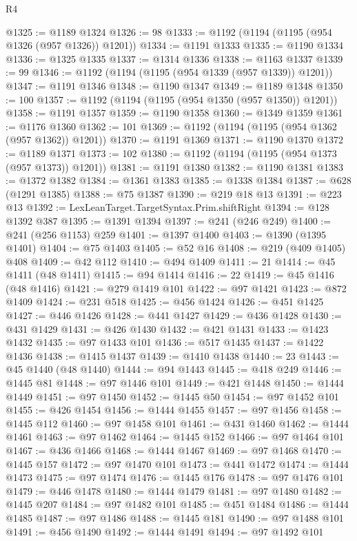 \begin{lexlean}{R4}
\begin{coremodule}
@1325 := @1189 @1324
@1326 := 98
@1333 := @1192 (@1194 (@1195 (@954 @1326 (@957 @1326)) @1201))
@1334 := @1191 @1333
@1335 := @1190 @1334
@1336 := @1325 @1335
@1337 := @1314 @1336
@1338 := @1163 @1337
@1339 := 99
@1346 := @1192 (@1194 (@1195 (@954 @1339 (@957 @1339)) @1201))
@1347 := @1191 @1346
@1348 := @1190 @1347
@1349 := @1189 @1348
@1350 := 100
@1357 := @1192 (@1194 (@1195 (@954 @1350 (@957 @1350)) @1201))
@1358 := @1191 @1357
@1359 := @1190 @1358
@1360 := @1349 @1359
@1361 := @1176 @1360
@1362 := 101
@1369 := @1192 (@1194 (@1195 (@954 @1362 (@957 @1362)) @1201))
@1370 := @1191 @1369
@1371 := @1190 @1370
@1372 := @1189 @1371
@1373 := 102
@1380 := @1192 (@1194 (@1195 (@954 @1373 (@957 @1373)) @1201))
@1381 := @1191 @1380
@1382 := @1190 @1381
@1383 := @1372 @1382
@1384 := @1361 @1383
@1385 := @1338 @1384
@1387 := @628 (@1291 @1385)
@1388 := @75 @1387
@1390 := @219 @18 @13
@1391 := @223 @13
@1392 := LexLeanTarget.TargetSyntax.Prim.shiftRight
@1394 := @128 @1392 @387
@1395 := @1391 @1394
@1397 := @241 (@246 @249)
@1400 := @241 (@256 @1153) @259
@1401 := @1397 @1400
@1403 := @1390 (@1395 @1401)
@1404 := @75 @1403
@1405 := @52 @16
@1408 := @219 (@409 @1405) @408
@1409 := @42 @112
@1410 := @494 @1409
@1411 := 21
@1414 := @45 @1411 (@48 @1411)
@1415 := @94 @1414
@1416 := 22
@1419 := @45 @1416 (@48 @1416)
@1421 := @279 @1419 @101
@1422 := @97 @1421
@1423 := @872 @1409
@1424 := @231 @518
@1425 := @456 @1424
@1426 := @451 @1425
@1427 := @446 @1426
@1428 := @441 @1427
@1429 := @436 @1428
@1430 := @431 @1429
@1431 := @426 @1430
@1432 := @421 @1431
@1433 := @1423 @1432
@1435 := @97 @1433 @101
@1436 := @517 @1435
@1437 := @1422 @1436
@1438 := @1415 @1437
@1439 := @1410 @1438
@1440 := 23
@1443 := @45 @1440 (@48 @1440)
@1444 := @94 @1443
@1445 := @418 @249
@1446 := @1445 @81
@1448 := @97 @1446 @101
@1449 := @421 @1448
@1450 := @1444 @1449
@1451 := @97 @1450
@1452 := @1445 @50
@1454 := @97 @1452 @101
@1455 := @426 @1454
@1456 := @1444 @1455
@1457 := @97 @1456
@1458 := @1445 @112
@1460 := @97 @1458 @101
@1461 := @431 @1460
@1462 := @1444 @1461
@1463 := @97 @1462
@1464 := @1445 @152
@1466 := @97 @1464 @101
@1467 := @436 @1466
@1468 := @1444 @1467
@1469 := @97 @1468
@1470 := @1445 @157
@1472 := @97 @1470 @101
@1473 := @441 @1472
@1474 := @1444 @1473
@1475 := @97 @1474
@1476 := @1445 @176
@1478 := @97 @1476 @101
@1479 := @446 @1478
@1480 := @1444 @1479
@1481 := @97 @1480
@1482 := @1445 @207
@1484 := @97 @1482 @101
@1485 := @451 @1484
@1486 := @1444 @1485
@1487 := @97 @1486
@1488 := @1445 @181
@1490 := @97 @1488 @101
@1491 := @456 @1490
@1492 := @1444 @1491
@1494 := @97 @1492 @101

\end{coremodule}
\end{lexlean}
